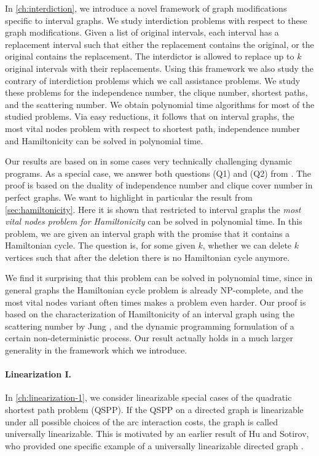 In \cref{ch:interdiction}, we introduce a novel framework of graph modifications specific to interval graphs. We study interdiction problems with respect to these graph modifications. 
Given a list of original intervals, each interval has a replacement interval such that either the replacement contains the original, or the original contains the replacement. 
The interdictor is allowed to replace up to $k$ original intervals with their replacements. 
Using this framework we also study the contrary of interdiction problems which we call assistance problems. We study these problems for the independence number, the clique number, shortest paths, and the scattering number. 
We obtain polynomial time algorithms for most of the studied problems. Via easy reductions, it follows that on interval graphs, the most vital nodes problem with respect to shortest path, independence number and Hamiltonicity can be solved in polynomial time.

Our results are based on in some cases very technically challenging dynamic programs. As a special case, we answer both questions (Q1) and (Q2) from \cite{diner2018contractionDeletionBlockers}. The proof is based on the duality of independence number and clique cover number in perfect graphs. We want to highlight in particular the result from \cref{sec:hamiltonicity}. 
Here it is shown that restricted to interval graphs the \emph{most vital nodes problem for Hamiltonicity} can be solved in polynomial time. 
In this problem, we are given an interval graph with the promise that it contains a Hamiltonian cycle. The question is, for some given $k$, whether we can delete $k$ vertices such that after the deletion there is no Hamiltonian cycle anymore. 

We find it surprising that this problem can be solved in polynomial time, since in general graphs the Hamiltonian cycle problem is already NP-complete, and the most vital nodes variant often times makes a problem even harder. Our proof is based on the characterization of Hamiltonicity of an interval graph using the scattering number by Jung \cite{jung1978scat}, and the dynamic programming formulation of a certain non-deterministic process. Our result actually holds in a much larger generality in the framework which we introduce.

\paragraph*{Linearization I.}
In \cref{ch:linearization-1}, we consider linearizable special cases of the quadratic shortest path problem (QSPP). If the QSPP on a directed graph is linearizable under all possible choices of the arc interaction costs, the graph is called universally linearizable. This is motivated by an earlier result of Hu and Sotirov, who provided one specific example of a universally linearizable directed graph \cite{huSo2018}.


